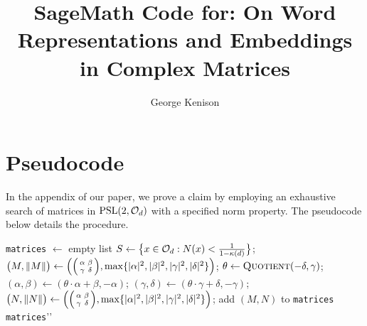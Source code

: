 \documentclass[runningheads]{llncs}
\begin{document}
\title{SageMath Code for: On Word Representations and Embeddings in Complex Matrices
}

\author{George Kenison}
\institute{}

\maketitle

\section{Pseudocode}

In the appendix of our paper, we prove a claim by employing an exhaustive search of matrices in \(\PSL(2,\Oc_d)\) with a specified norm property. The pseudocode below details the procedure.

\begin{algorithm}
\begin{algorithmic}
\State \texttt{matrices} \(\leftarrow\) empty list 
\State \(S\leftarrow \bigl\{x\in \mathcal{O}_d : N(x) < \tfrac{1}{1-\kappa(d)}\bigr\}\); 
\State \(\bigl( M, \|M\|\bigr)  \leftarrow \left( \begin{psmallmatrix} \alpha & \beta \\ \gamma & \delta \end{psmallmatrix} , \max\{|\alpha|^2, |\beta|^2, |\gamma|^2, |\delta|^2\}\right)\); 
\State \(\theta \leftarrow \textsc{Quotient}(-\delta, \gamma)\);  %
\State \((\alpha,\beta) \leftarrow (\theta \cdot \alpha + \beta, -\alpha)\); 
\State \((\gamma, \delta) \leftarrow (\theta \cdot \gamma + \delta, -\gamma)\);
\State \(\bigl( N, \|N\| \bigr)  \leftarrow \left(\begin{psmallmatrix} \alpha & \beta \\ \gamma & \delta \end{psmallmatrix}, \max\{|\alpha|^2, |\beta|^2, |\gamma|^2, |\delta|^2\} \right)  \); 
\State add \((M, N)\) to \texttt{matrices} %
\EndIf
\EndFor
{}
\State {}
\Else
\State {} \texttt{matrices}\rq\rq
\EndIf
\caption{Search and verification of claim in \(\PSL(2,\Oc_d)\).\label{alg:cap}}
\end{algorithmic}
\end{algorithm}
\end{document}
